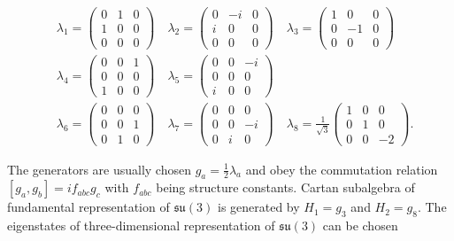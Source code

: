 \documentclass[a4paper,11pt]{report}
\begin{document}
\begin{align}
  &\lambda_1 = \begin{pmatrix} 0 & 1 & 0 \\ 1 & 0 & 0 \\ 0 & 0 & 0 \end{pmatrix}
  \quad
  \lambda_2 = \begin{pmatrix} 0 & -i & 0 \\ i & 0 & 0 \\ 0 & 0 & 0 \end{pmatrix}
  \quad
  \lambda_3 = \begin{pmatrix} 1 & 0 & 0 \\ 0 & -1& 0 \\ 0 & 0 & 0 \end{pmatrix}
  \nonumber \\
  &\lambda_4 = \begin{pmatrix} 0 & 0 & 1 \\ 0 & 0 & 0 \\ 1 & 0 & 0 \end{pmatrix}
  \quad
  \lambda_5 = \begin{pmatrix} 0 & 0 & -i\\ 0 & 0 & 0 \\ i & 0 & 0 \end{pmatrix}
  \label{eq:GellMannMatrices} \\
  &\lambda_6 = \begin{pmatrix} 0 & 0 & 0 \\ 0 & 0 & 1 \\ 0 & 1 & 0 \end{pmatrix}
  \quad
  \lambda_7 = \begin{pmatrix} 0 & 0 & 0 \\ 0 & 0 & -i\\ 0 & i & 0 \end{pmatrix}
  \quad
  \lambda_8 = \frac{1}{\sqrt{3}} \begin{pmatrix} 1 & 0 & 0 \\ 0 & 1 & 0 \\ 
                                                              0 & 0 & -2 \end{pmatrix}.
  \nonumber
\end{align}

The generators are usually chosen $g_a = \frac{1}{2} \lambda_a$ and obey the
commutation relation $[g_a,g_b]=if_{abc}g_c$ with $f_{abc}$ being structure
constants. Cartan subalgebra of fundamental representation of $\mathfrak{su}(3)$
is generated by $H_1=g_3$ and $H_2=g_8$. The eigenstates of three-dimensional
representation of $\mathfrak{su}(3)$ can be chosen 
\end{document}
